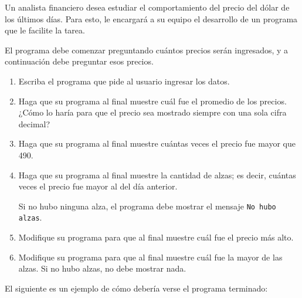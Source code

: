 Un analista financiero desea estudiar el comportamiento
del precio del dólar de los últimos días.
Para esto, le encargará a su equipo
el desarrollo de un programa que le facilite la tarea.

El programa debe comenzar preguntando
cuántos precios serán ingresados,
y a continuación debe preguntar esos precios.

\begin{enumerate}[leftmargin=0pt,start=0]

  \item
    Escriba el programa que pide al usuario ingresar los datos.

  \item
    Haga que su programa al final muestre
    cuál fue el promedio de los precios.
    ¿Cómo lo haría para que el precio sea mostrado
    siempre con una sola cifra decimal?

  \item
    Haga que su programa al final muestre
    cuántas veces el precio fue mayor que 490.

  \item
    Haga que su programa al final muestre
    la cantidad de alzas;
    es decir, cuántas veces el precio fue mayor
    al del día anterior.

    Si no hubo ninguna alza,
    el programa debe mostrar el mensaje
    \texttt{No hubo alzas}.

  \item
    Modifique su programa para que al final muestre
    cuál fue el precio más alto.

  \item
    Modifique su programa para que al final muestre
    cuál fue la mayor de las alzas.
    Si no hubo alzas, no debe mostrar nada.

\end{enumerate}

El siguiente es un ejemplo de cómo debería verse el programa terminado:

\begin{minipage}[t]{0.6\textwidth}
  
\end{minipage}

